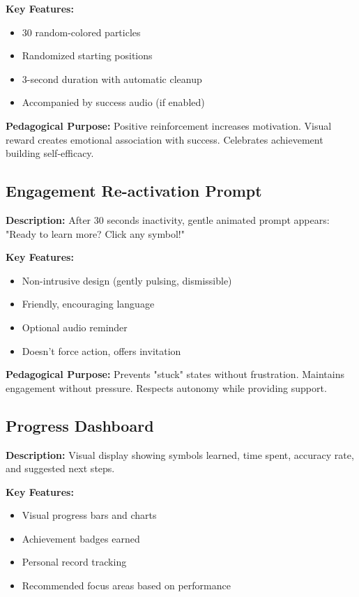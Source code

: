 \documentclass[11pt, a4paper]{article}
\begin{document}
\textbf{Key Features:}
\begin{itemize}[leftmargin=*, noitemsep]
    \item 30 random-colored particles
    \item Randomized starting positions
    \item 3-second duration with automatic cleanup
    \item Accompanied by success audio (if enabled)
\end{itemize}

\textbf{Pedagogical Purpose:} Positive reinforcement increases motivation. Visual reward creates emotional association with success. Celebrates achievement building self-efficacy.

\subsection{Engagement Re-activation Prompt}
\textbf{Description:} After 30 seconds inactivity, gentle animated prompt appears: "Ready to learn more? Click any symbol!"

\textbf{Key Features:}
\begin{itemize}[leftmargin=*, noitemsep]
    \item Non-intrusive design (gently pulsing, dismissible)
    \item Friendly, encouraging language
    \item Optional audio reminder
    \item Doesn't force action, offers invitation
\end{itemize}

\textbf{Pedagogical Purpose:} Prevents "stuck" states without frustration. Maintains engagement without pressure. Respects autonomy while providing support.

\subsection{Progress Dashboard}
\textbf{Description:} Visual display showing symbols learned, time spent, accuracy rate, and suggested next steps.

\textbf{Key Features:}
\begin{itemize}[leftmargin=*, noitemsep]
    \item Visual progress bars and charts
    \item Achievement badges earned
    \item Personal record tracking
    \item Recommended focus areas based on performance
\end{itemize}
\end{document}
